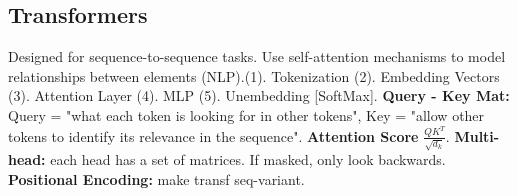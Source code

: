 \subsection*{Transformers}
Designed for sequence-to-sequence tasks. Use self-attention mechanisms to model relationships between elements (NLP).(1). Tokenization (2). Embedding Vectors (3). Attention Layer (4). MLP (5). Unembedding [SoftMax].
\textbf{Query - Key Mat:} Query = "what each token is looking for in other tokens", Key = "allow other tokens to identify its relevance in the sequence". \textbf{Attention Score} $\frac{QK^T}{\sqrt{d_k}}$. \textbf{Multi-head:} each head has a set of matrices. If masked, only look backwards. \textbf{Positional Encoding:} make transf seq-variant.
